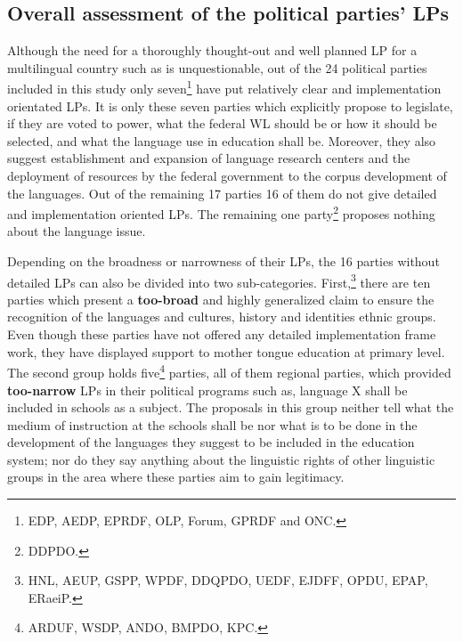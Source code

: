\documentclass[output=paper,modfonts]{langscibook}
\begin{document}
\subsection{Overall assessment of the political parties’ LPs} 
Although the need for a thoroughly thought-out and well planned LP for a multilingual country such as  is unquestionable, out of the 24 political parties included in this study only seven\footnote{EDP, AEDP, EPRDF, OLP, Forum, GPRDF and ONC.} have put relatively clear and implementation orientated LPs. It is only these seven parties which explicitly propose to legislate, if they are voted to power, what the federal WL should be or how it should be selected, and what the language use in education shall be. Moreover, they also suggest establishment and expansion of language research centers and the deployment of resources by the federal government to the corpus development of the languages. Out of the remaining 17 parties 16 of them do not give detailed and implementation oriented LPs. The remaining one party\footnote{DDPDO.} proposes nothing about the language issue. 

Depending on the broadness or narrowness of their LPs, the 16 parties without detailed LPs can also be divided into two sub-categories. First,\footnote{HNL, AEUP, GSPP, WPDF, DDQPDO, UEDF, EJDFF, OPDU, EPAP, ERaeiP.} there are ten parties which present a \textbf{too-broad} and highly generalized claim to ensure the recognition of the languages and cultures, history and identities ethnic groups. Even though these parties have not offered any detailed implementation frame work, they have displayed support to mother tongue education at primary level. The second group holds five\footnote{ARDUF, WSDP, ANDO, BMPDO, KPC.} parties, all of them regional parties, which provided \textbf{too-narrow} LPs in their political programs such as, language X shall be included in schools as a subject. The proposals in this group neither tell what the medium of instruction at the schools shall be nor what is to be done in the development of the languages they suggest to be included in the education system; nor do they say anything about the linguistic rights of other linguistic groups in the area where these parties aim to gain legitimacy.
 
\end{document}
